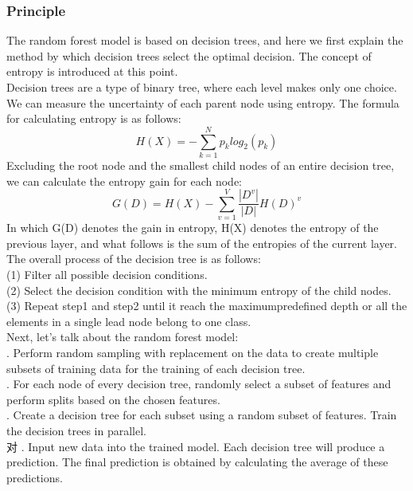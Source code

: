 \documentclass[a4paper]{article}
\begin{document}
\subsubsection{Principle}
The random forest model is based on decision trees, and here we first explain the method by which decision trees select the optimal decision. The concept of entropy is introduced at this point.\\
Decision trees are a type of binary tree, where each level makes only one choice. We can measure the uncertainty of each parent node using entropy. The formula for calculating entropy is as follows:\\
$$H(X)= -\sum_{k=1}^N p_k log_2(p_k)$$
Excluding the root node and the smallest child nodes of an entire decision tree, we can calculate the entropy gain for each node:
$$G(D)= H(X)-\sum_{v=1}^V \frac {\left|D^v\right|}{\left|D\right|} H(D)^v$$
In which G(D) denotes the gain in entropy, H(X) denotes the entropy of the previous layer, and what follows is the sum of the entropies of the current layer.\\
The overall process of the decision tree is as follows:\\
(1) Filter all possible decision conditions.\\%
(2) Select the decision condition with the minimum entropy of the child nodes.\\%
(3) Repeat step1 and step2 until it reach the maximumpredefined depth or all the elements in a single lead node belong to one class.\\[1em]
Next, let's talk about the random forest model:\\[0.5em]%
. Perform random sampling with replacement on the data to create multiple subsets of training data for the training of each decision tree.\\[0.5em]%
. For each node of every decision tree, randomly select a subset of features and perform splits based on the chosen features.\\[0.5em]%
. Create a decision tree for each subset using a random subset of features. Train the decision trees in parallel.\\[0.5em]对%
. Input new data into the trained model. Each decision tree will produce a prediction. The final prediction is obtained by calculating the average of these predictions.\\[0.5em]%
\end{document}

